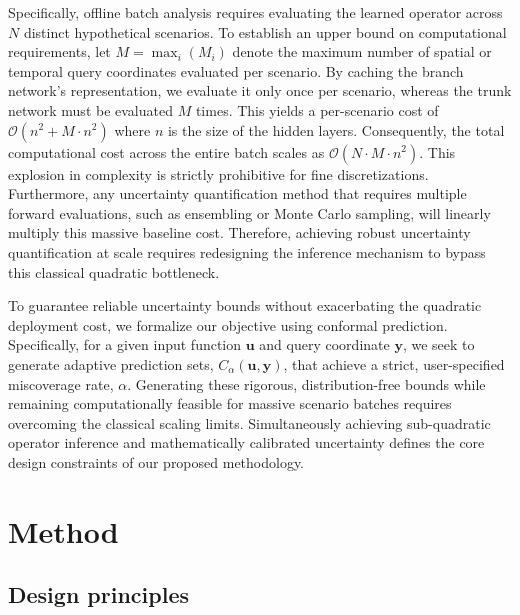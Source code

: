 \documentclass{iopjournal}
\begin{document}
Specifically, offline batch analysis requires evaluating the learned operator across $N$ distinct hypothetical scenarios. To establish an upper bound on computational requirements, let $M = \max_{i}(M_{i})$ denote the maximum number of spatial or temporal query coordinates evaluated per scenario. By caching the branch network's representation, we evaluate it only once per scenario, whereas the trunk network must be evaluated $M$ times. This yields a per-scenario cost of $\mathcal{O}(n^{2} + M \cdot n^{2})$ where $n$ is the size of the hidden layers. Consequently, the total computational cost across the entire batch scales as $\mathcal{O}(N \cdot M \cdot n^{2})$. This explosion in complexity is strictly prohibitive for fine discretizations. Furthermore, any uncertainty quantification method that requires multiple forward evaluations, such as ensembling or Monte Carlo sampling, will linearly multiply this massive baseline cost. Therefore, achieving robust uncertainty quantification at scale requires redesigning the inference mechanism to bypass this classical quadratic bottleneck.

To guarantee reliable uncertainty bounds without exacerbating the quadratic deployment cost, we formalize our objective using conformal prediction. Specifically, for a given input function $\mathbf{u}$ and query coordinate $\mathbf{y}$, we seek to generate adaptive prediction sets, $C_\alpha (\mathbf{u},\mathbf{y})$, that achieve a strict, user-specified miscoverage rate, $\alpha$. Generating these rigorous, distribution-free bounds while remaining computationally feasible for massive scenario batches requires overcoming the classical scaling limits. Simultaneously achieving sub-quadratic operator inference and mathematically calibrated uncertainty defines the core design constraints of our proposed methodology.



\section{Method}
\label{sec:method}

\subsection{Design principles}
\end{document}

